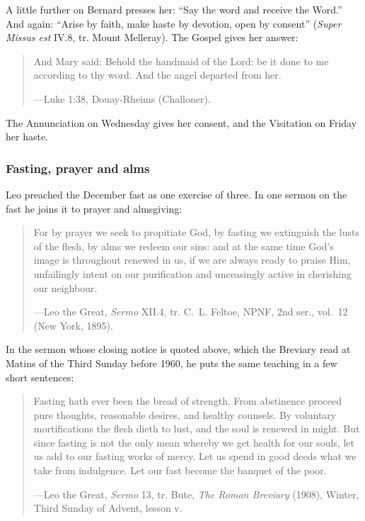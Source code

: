 A little further on Bernard presses her: ``Say the word and receive the Word.'' And again:
``Arise by faith, make haste by devotion, open by consent'' (\textit{Super Missus est} IV.8, tr.
Mount Melleray). The Gospel gives her answer:

\begin{quote}
And Mary said: Behold the handmaid of the Lord: be it done to me according to thy word. And the
angel departed from her.\par
{\smallskip\noindent\small ---Luke 1:38, Douay-Rheims (Challoner).\par}
\end{quote}

\noindent The Annunciation on Wednesday gives her consent, and the Visitation on Friday her haste.

\subsubsection{Fasting, prayer and alms}

Leo preached the December fast as one exercise of three. In one sermon on the fast he joins it to
prayer and almsgiving:

\begin{quote}
For by prayer we seek to propitiate God, by fasting we extinguish the lusts of the flesh, by alms
we redeem our sins: and at the same time God's image is throughout renewed in us, if we are always
ready to praise Him, unfailingly intent on our purification and unceasingly active in cherishing
our neighbour.\par
{\smallskip\noindent\small ---Leo the Great, \textit{Sermo} XII.4, tr. C.~L. Feltoe, NPNF, 2nd
ser., vol.~12 (New York, 1895).\par}
\end{quote}

In the sermon whose closing notice is quoted above, which the Breviary read at Matins of the Third
Sunday before 1960, he puts the same teaching in a few short sentences:

\begin{quote}
Fasting hath ever been the bread of strength. From abstinence proceed pure thoughts, reasonable
desires, and healthy counsels. By voluntary mortifications the flesh dieth to lust, and the soul
is renewed in might. But since fasting is not the only mean whereby we get health for our souls,
let us add to our fasting works of mercy. Let us spend in good deeds what we take from indulgence.
Let our fast become the banquet of the poor.\par
{\smallskip\noindent\small ---Leo the Great, \textit{Sermo} 13, tr. Bute, \textit{The Roman
Breviary} (1908), Winter, Third Sunday of Advent, lesson v.\par}
\end{quote}

